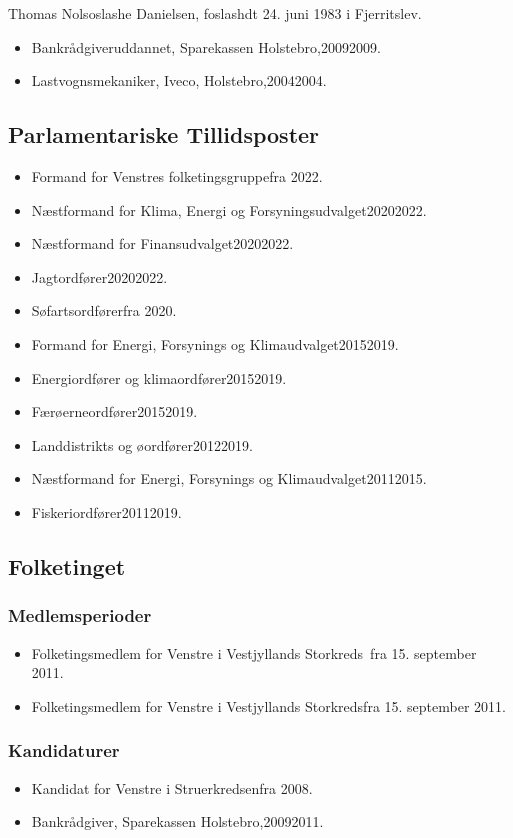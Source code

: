 \documentclass[11pt, a4paper]{awesome-cv}
\begin{document}
\makecvheader[R]
\makelettertitle
\begin{cvletter}
Thomas Nolsoslashe Danielsen, foslashdt 24. juni 1983 i Fjerritslev.

\begin{itemize}
\item Bankrådgiveruddannet, Sparekassen Holstebro,20092009.
\item Lastvognsmekaniker, Iveco, Holstebro,20042004.
\end{itemize}
\subsection*{Parlamentariske Tillidsposter}
\begin{itemize}
\item Formand for Venstres folketingsgruppefra 2022.
\item Næstformand for Klima, Energi og Forsyningsudvalget20202022.
\item Næstformand for Finansudvalget20202022.
\item Jagtordfører20202022.
\item Søfartsordførerfra 2020.
\item Formand for Energi, Forsynings og Klimaudvalget20152019.
\item Energiordfører og klimaordfører20152019.
\item Færøerneordfører20152019.
\item Landdistrikts og øordfører20122019.
\item Næstformand for Energi, Forsynings og Klimaudvalget20112015.
\item Fiskeriordfører20112019.
\end{itemize}
\subsection*{Folketinget}
\subsubsection*{Medlemsperioder}
\begin{itemize}
\item Folketingsmedlem for Venstre i Vestjyllands Storkreds fra 15. september 2011.
\item Folketingsmedlem for Venstre i Vestjyllands Storkredsfra 15. september 2011.
\end{itemize}
\subsubsection*{Kandidaturer}
\begin{itemize}
\item Kandidat for Venstre i Struerkredsenfra 2008.
\end{itemize}
\begin{itemize}
\item Bankrådgiver, Sparekassen Holstebro,20092011.
\end{itemize}
\end{cvletter}
\end{document}
